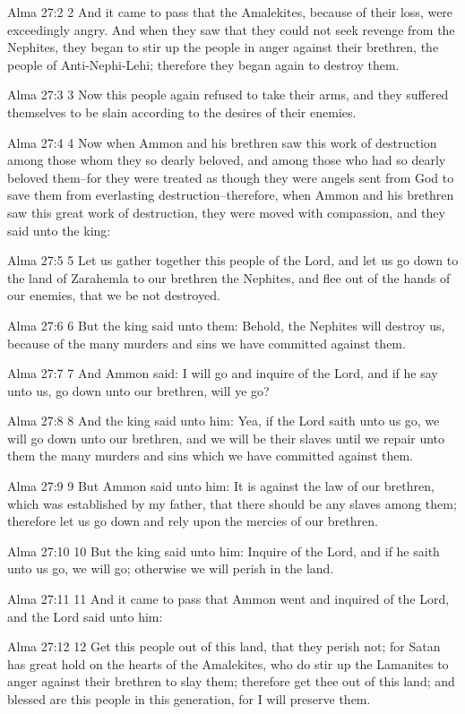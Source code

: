 Alma 27:2
 2 And it came to pass that the Amalekites, because of their
loss, were exceedingly angry. And when they saw that they could
not seek revenge from the Nephites, they began to stir up the
people in anger against their brethren, the people of
Anti-Nephi-Lehi; therefore they began again to destroy them.

Alma 27:3
 3 Now this people again refused to take their arms, and they
suffered themselves to be slain according to the desires of their
enemies.

Alma 27:4
 4 Now when Ammon and his brethren saw this work of destruction
among those whom they so dearly beloved, and among those who had
so dearly beloved them--for they were treated as though they were
angels sent from God to save them from everlasting
destruction--therefore, when Ammon and his brethren saw this
great work of destruction, they were moved with compassion, and
they said unto the king:

Alma 27:5
 5 Let us gather together this people of the Lord, and let us go
down to the land of Zarahemla to our brethren the Nephites, and
flee out of the hands of our enemies, that we be not destroyed.

Alma 27:6
 6 But the king said unto them: Behold, the Nephites will destroy
us, because of the many murders and sins we have committed
against them.

Alma 27:7
 7 And Ammon said: I will go and inquire of the Lord, and if he
say unto us, go down unto our brethren, will ye go?

Alma 27:8
 8 And the king said unto him: Yea, if the Lord saith unto us go,
we will go down unto our brethren, and we will be their slaves
until we repair unto them the many murders and sins which we have
committed against them.

Alma 27:9
 9 But Ammon said unto him: It is against the law of our
brethren, which was established by my father, that there should
be any slaves among them; therefore let us go down and rely upon
the mercies of our brethren.

Alma 27:10
 10 But the king said unto him: Inquire of the Lord, and if he
saith unto us go, we will go; otherwise we will perish in the
land.

Alma 27:11
 11 And it came to pass that Ammon went and inquired of the Lord,
and the Lord said unto him:

Alma 27:12
 12 Get this people out of this land, that they perish not; for
Satan has great hold on the hearts of the Amalekites, who do stir
up the Lamanites to anger against their brethren to slay them;
therefore get thee out of this land; and blessed are this people
in this generation, for I will preserve them.

